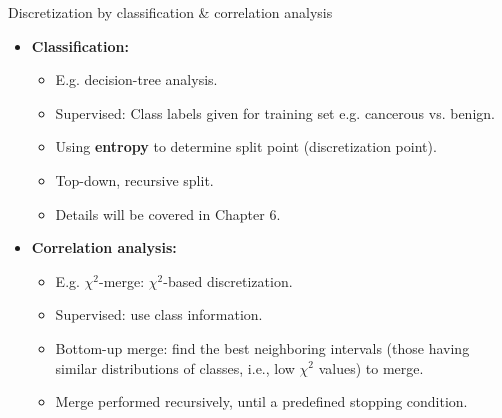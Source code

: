 \documentclass[aspectratio=169,t]{beamer}
\begin{document}
  { 
    \begin{frame}{Discretization by classification \& correlation analysis}
        \begin{itemize}
            \item \textbf{Classification:}
            \begin{itemize}
              \item E.g. decision-tree analysis.
              \item Supervised: Class labels given for training set e.g. cancerous vs. benign.
              \item Using \textbf{entropy} to determine split point (discretization point).
              \item Top-down, recursive split.
              \item Details will be covered in Chapter 6.
            \end{itemize}
            \item \textbf{Correlation analysis:}
            \begin{itemize}
              \item E.g. $\chi^2$-merge: $\chi^2$-based discretization.
              \item Supervised: use class information.
              \item Bottom-up merge: find the best neighboring intervals (those having similar distributions of classes, i.e., low $\chi^2$ values) to merge.
              \item Merge performed recursively, until a predefined stopping condition.
            \end{itemize}
        \end{itemize}
    \end{frame}
  }
\end{document}

